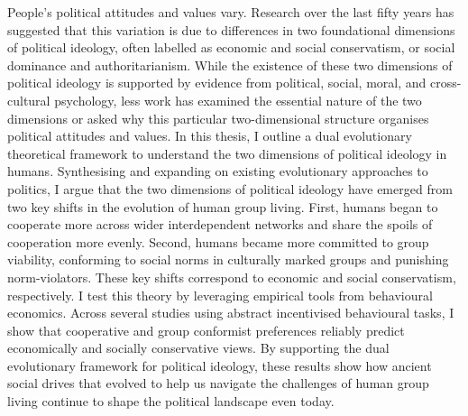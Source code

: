 People's political attitudes and values vary. Research over the last fifty years has suggested that this variation is due to differences in two foundational dimensions of political ideology, often labelled as economic and social conservatism, or social dominance and authoritarianism. While the existence of these two dimensions of political ideology is supported by evidence from political, social, moral, and cross-cultural psychology, less work has examined the essential nature of the two dimensions or asked why this particular two-dimensional structure organises political attitudes and values. In this thesis, I outline a dual evolutionary theoretical framework to understand the two dimensions of political ideology in humans. Synthesising and expanding on existing evolutionary approaches to politics, I argue that the two dimensions of political ideology have emerged from two key shifts in the evolution of human group living. First, humans began to cooperate more across wider interdependent networks and share the spoils of cooperation more evenly. Second, humans became more committed to group viability, conforming to social norms in culturally marked groups and punishing norm-violators. These key shifts correspond to economic and social conservatism, respectively. I test this theory by leveraging empirical tools from behavioural economics. Across several studies using abstract incentivised behavioural tasks, I show that cooperative and group conformist preferences reliably predict economically and socially conservative views. By supporting the dual evolutionary framework for political ideology, these results show how ancient social drives that evolved to help us navigate the challenges of human group living continue to shape the political landscape even today.